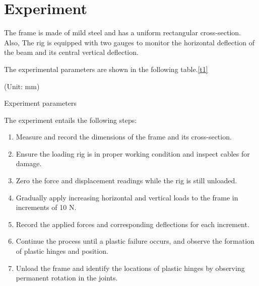 \section{Experiment}
\FloatBarrier %

The frame is made of mild steel and has a uniform rectangular cross-section. Also, The rig is equipped with two gauges to monitor the horizontal deflection of the beam and its central vertical deflection.

The experimental parameters are shown in the following table.\ref{t1}

\begin{minipage}[htbp]{\textwidth}
    \makeatletter{}
    \centering

    (Unit: mm)
    \caption{Experiment parameters}
    \label{t1} 
\end{minipage}


The experiment entails the following steps:
\begin{enumerate}
    \item Measure and record the dimensions of the frame and its cross-section.

    \item Ensure the loading rig is in proper working condition and inspect cables for damage.
    
    \item Zero the force and displacement readings while the rig is still unloaded.
    
    \item Gradually apply increasing horizontal and vertical loads to the frame in increments of 10 N.
    
    \item Record the applied forces and corresponding deflections for each increment.
    
    \item Continue the process until a plastic failure occurs, and observe the formation of plastic hinges and position.
    
    \item Unload the frame and identify the locations of plastic hinges by observing permanent rotation in the joints.
    
\end{enumerate}


